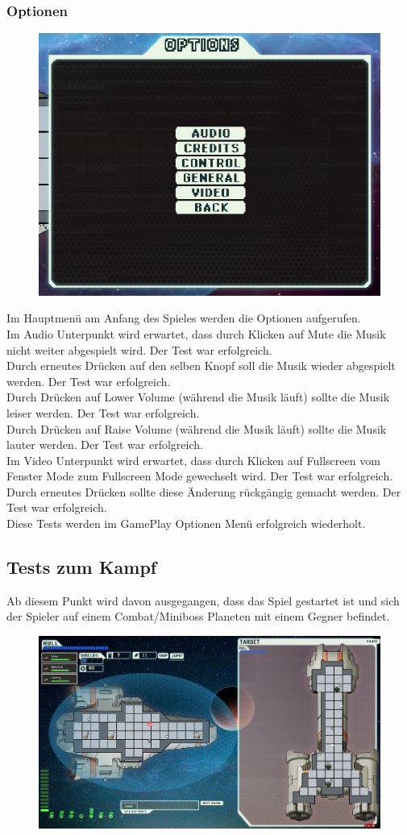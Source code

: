 \documentclass[fontsize=12pt,paper=a4,twoside]{scrartcl}
\begin{document}
\subsubsection{Optionen}
\begin{figure}[h!]
\centering
\includegraphics[width=0.5\linewidth]{images/options.png}
\end{figure}
Im Hauptmenü am Anfang des Spieles werden die Optionen aufgerufen. \\
Im Audio Unterpunkt wird erwartet, dass durch Klicken auf Mute die Musik nicht weiter abgespielt wird. Der Test war erfolgreich. \\
Durch erneutes Drücken auf den selben Knopf soll die Musik wieder abgespielt werden. Der Test war erfolgreich. \\
Durch Drücken auf Lower Volume (während die Musik läuft) sollte die Musik leiser werden. Der Test war erfolgreich. \\
Durch Drücken auf Raise Volume (während die Musik läuft) sollte die Musik lauter werden. Der Test war erfolgreich. \\
Im Video Unterpunkt wird erwartet, dass durch Klicken auf Fullscreen vom Fenster Mode zum Fullscreen Mode gewechselt wird.  Der Test war erfolgreich. \\
Durch erneutes Drücken sollte diese Änderung rückgängig gemacht werden.  Der Test war erfolgreich. \\
Diese Tests werden im GamePlay Optionen Menü erfolgreich wiederholt. \\



\subsection{Tests zum Kampf}
Ab diesem Punkt wird davon ausgegangen, dass das Spiel gestartet ist und sich der Spieler auf einem Combat/Miniboss Planeten mit einem Gegner befindet. \\
\begin{figure}[h!]
\centering
\includegraphics[width=0.5\linewidth]{images/battle.png}
\end{figure}
\end{document}
